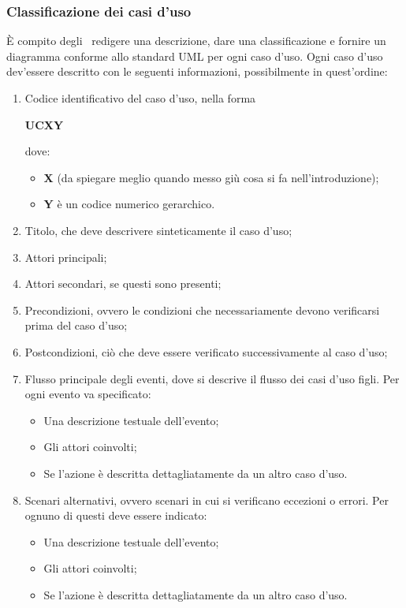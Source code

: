 \documentclass[../NormeProgetto.tex]{subfiles}
\begin{document}
		\subsubsection{Classificazione dei casi d'uso}
		È compito degli \analisti\ redigere una descrizione, dare una classificazione e fornire un diagramma conforme allo standard UML per ogni caso d'uso. Ogni caso d'uso dev'essere descritto con le seguenti informazioni, possibilmente in quest'ordine:
		\begin{enumerate}
			\item Codice identificativo del caso d'uso, nella forma \begin{center}\textbf{UCXY}\end{center} dove:
				\begin{itemize}
					\item \textbf{X} (da spiegare meglio quando messo giù cosa si fa nell'introduzione);
					\item \textbf{Y} è un codice numerico gerarchico.
				\end{itemize}
			\item Titolo, che deve descrivere sinteticamente il caso d'uso;
			\item Attori principali;
			\item Attori secondari, se questi sono presenti;
			\item Precondizioni, ovvero le condizioni che necessariamente devono verificarsi prima del caso d'uso;
			\item Postcondizioni, ciò che deve essere verificato successivamente al caso d'uso;
			\item Flusso principale degli eventi, dove si descrive il flusso dei casi d'uso figli. Per ogni evento va specificato:
				\begin{itemize}
					\item Una descrizione testuale dell'evento;
					\item Gli attori coinvolti;
					\item Se l'azione è descritta dettagliatamente da un altro caso d'uso.
				\end{itemize}
			\item Scenari alternativi, ovvero scenari in cui si verificano eccezioni o errori. Per ognuno di questi deve essere indicato:
				\begin{itemize}
					\item Una descrizione testuale dell'evento;
					\item Gli attori coinvolti;
					\item Se l'azione è descritta dettagliatamente da un altro caso d'uso.
				\end{itemize}
		\end{enumerate}
\end{document}
